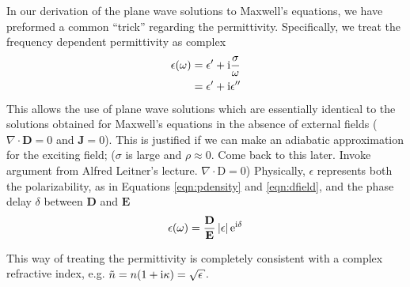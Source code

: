 In our derivation of the plane wave solutions to Maxwell's equations, we
have preformed a common ``trick'' regarding the permittivity.
Specifically, we treat the frequency dependent permittivity as complex
\begin{align}
 \epsilon(\omega) &= \epsilon^\prime + {\mathrm{i}} \frac{\sigma}{\omega}\\
                   &= \epsilon^\prime + {\mathrm{i}}\epsilon^{\prime\prime}
\end{align}
This allows the use of plane wave solutions which are essentially identical
to the solutions obtained for Maxwell's equations in the absence of
external fields ($\nabla \cdot \mathbf{D} = 0$ and $\mathbf{J} = 0$).  This
is justified if we can make an adiabatic approximation for the exciting
field; ($\sigma$ is large and $\rho\approx 0$. Come back to this later.
Invoke argument from Alfred Leitner's lecture. $\nabla \cdot \mathrm{D} = 0$)
Physically, $\epsilon$ represents
both the polarizability, as in Equations \ref{eqn:pdensity} and
\ref{eqn:dfield}, and the phase delay $\delta$ between $\mathbf{D}$ and
$\mathbf{E}$
\begin{equation}
 \epsilon(\omega) = \frac{\mathbf{D}}{\mathbf{E}} \,|\epsilon| \,{\mathrm{e}}^{{\mathrm{i}} \delta}
\end{equation}

This way of treating the permittivity is completely consistent with a complex
refractive index, e.g. $\tilde{n} = n(1+\mi \kappa) = \sqrt{\epsilon}$.


